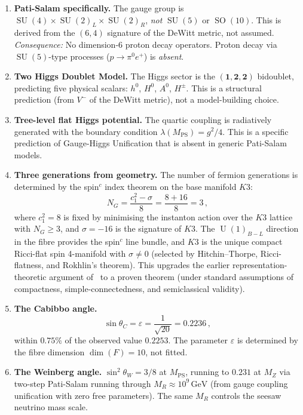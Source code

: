 \documentclass[12pt,a4paper]{article}
\theoremstyle{definition}
\newcommand{\SO}{\operatorname{SO}}
\newcommand{\SU}{\operatorname{SU}}
\newcommand{\U}{\operatorname{U}}
\newcommand{\MPS}{M_{\mathrm{PS}}}
\begin{document}
\begin{enumerate}
\item \textbf{Pati-Salam specifically.}
The gauge group is $\SU(4) \times \SU(2)_L \times \SU(2)_R$, \emph{not} $\SU(5)$ or $\SO(10)$.
This is derived from the $(6,4)$ signature of the DeWitt metric, not assumed.
\emph{Consequence:} No dimension-6 proton decay operators.
Proton decay via $\SU(5)$-type processes ($p \to \pi^0 e^+$) is \emph{absent}.

\item \textbf{Two Higgs Doublet Model.}
The Higgs sector is the $(\mathbf{1},\mathbf{2},\mathbf{2})$ bidoublet, predicting five physical scalars: $h^0$, $H^0$, $A^0$, $H^\pm$.
This is a structural prediction (from $V^-$ of the DeWitt metric), not a model-building choice.

\item \textbf{Tree-level flat Higgs potential.}
The quartic coupling is radiatively generated with the boundary condition $\lambda(\MPS) = g^2/4$.
This is a specific prediction of Gauge-Higgs Unification that is absent in generic Pati-Salam models.

\item \textbf{Three generations from geometry.}
The number of fermion generations is determined by the spin$^c$ index theorem on the base manifold $K3$:
\begin{equation}
N_G = \frac{c_1^2 - \sigma}{8} = \frac{8 + 16}{8} = 3\,,
\end{equation}
where $c_1^2 = 8$ is fixed by minimising the instanton action over the $K3$ lattice with $N_G \geq 3$, and $\sigma = -16$ is the signature of $K3$.
The $\U(1)_{B-L}$ direction in the fibre provides the spin$^c$ line bundle, and $K3$ is the unique compact Ricci-flat spin 4-manifold with $\sigma \neq 0$ (selected by Hitchin--Thorpe, Ricci-flatness, and Rokhlin's theorem).
This upgrades the earlier representation-theoretic argument of~\cite{Paper5} to a proven theorem (under standard assumptions of compactness, simple-connectedness, and semiclassical validity).

\item \textbf{The Cabibbo angle.}
\begin{equation}
\sin\theta_C = \varepsilon = \frac{1}{\sqrt{20}} = 0.2236\,,
\end{equation}
within $0.75\%$ of the observed value $0.2253$.
The parameter $\varepsilon$ is determined by the fibre dimension $\dim(F) = 10$, not fitted.

\item \textbf{The Weinberg angle.}
$\sin^2\theta_W = 3/8$ at $\MPS$, running to $0.231$ at $M_Z$ via two-step Pati-Salam running through $M_R \approx 10^{9}\,\mathrm{GeV}$ (from gauge coupling unification with zero free parameters).
The same $M_R$ controls the seesaw neutrino mass scale.


\end{enumerate}
\end{document}
